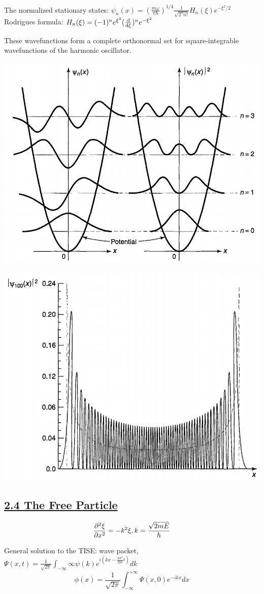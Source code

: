 The normalized stationary states: $\psi_n(x) = (\frac{m \omega}{\pi \hbar})^{1/4} \frac{1}{\sqrt{2^n n!}} H_n(\xi) e^{-\xi^2 / 2}$ \\

Rodrigues formula: $H_n(\xi) = (-1)^n e^{\xi^2} (\dv{}{\xi})^n e^{-\xi^2}$

These wavefunctions form a complete orthonormal set for square-integrable wavefunctions of the harmonic oscillator.\\

\vspace{0em}
\begin{Figure}
    \raggedright
    \includegraphics[width=0.4\columnwidth]{figures/harmonic_oscillator1.png}
\end{Figure}

\vspace{-11em}
\begin{Figure}
    \raggedleft
    \includegraphics[width=0.4\columnwidth]{figures/harmonic_oscillator2.png}
\end{Figure}
\vspace{-1em}

\subsection{\underline{2.4 The Free Particle}}
$$\pdv[2]{\xi}{x} = -k^2 \xi, k = \frac{\sqrt{2mE}}{\hbar}$$

General solution to the TISE: wave packet, $\Psi(x, t) = \frac{1}{\sqrt{2\pi}} \int_{-\infty}{\infty} \psi(k) e^{i (kx - \frac{\hbar k^2}{2m} t)} dk$ \\
$$\phi(x) = \frac{1}{\sqrt{2 \pi}} \int_{-\infty}^{+\infty} \Psi(x, 0) e^{-ikx} dx$$

